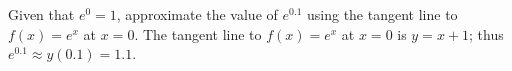 {Given that $e^0=1$, approximate the value of $e^{0.1}$ using the tangent line to $f(x) = e^x$ at $x=0$.
}
{The tangent line to $f(x) = e^x$ at $x=0$ is $y=x+1$; thus $e^{0.1} \approx y(0.1) = 1.1$. 
}
